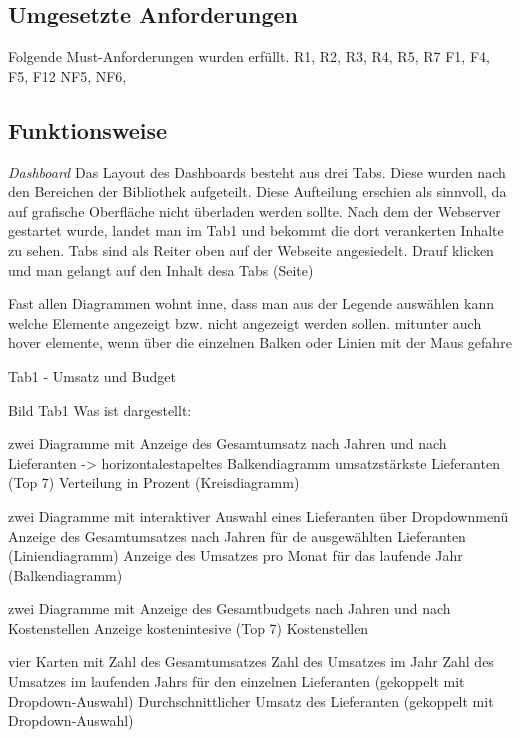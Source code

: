   

    \subsection{Umgesetzte Anforderungen}
    Folgende Must-Anforderungen wurden erfüllt.
    R1, R2, R3, R4, R5, R7
    F1, F4, F5, F12
    NF5, NF6, 
    \subsection{Funktionsweise}
    \textit{Dashboard}
    Das Layout des Dashboards besteht aus drei Tabs. Diese wurden nach den Bereichen der Bibliothek aufgeteilt. Diese Aufteilung erschien als sinnvoll,
    da auf grafische Oberfläche nicht überladen werden sollte.
    Nach dem der Webserver gestartet wurde, landet man im Tab1 und bekommt die dort verankerten Inhalte zu sehen.
    Tabs sind als Reiter oben auf der Webseite angesiedelt.
    Drauf klicken und man gelangt auf den Inhalt desa Tabs (Seite)
    
    Fast allen Diagrammen wohnt inne, dass man aus der Legende auswählen kann welche Elemente angezeigt bzw. nicht angezeigt werden sollen.
    mitunter auch hover elemente, wenn über die einzelnen Balken oder Linien mit der Maus gefahre 
    
    Tab1 - Umsatz und Budget
    
    Bild Tab1
    Was ist dargestellt:
    
    zwei Diagramme mit 
        Anzeige des Gesamtumsatz nach Jahren und nach Lieferanten ->  horizontalestapeltes Balkendiagramm
        umsatzstärkste Lieferanten (Top 7) Verteilung in Prozent (Kreisdiagramm)
        
    zwei Diagramme mit interaktiver Auswahl eines Lieferanten über Dropdownmenü
        Anzeige des Gesamtumsatzes nach Jahren für de ausgewählten Lieferanten (Liniendiagramm)
        Anzeige des Umsatzes pro Monat für das laufende Jahr (Balkendiagramm)
    
    zwei Diagramme mit
        Anzeige des Gesamtbudgets nach Jahren und nach Kostenstellen 
        Anzeige kostenintesive (Top 7) Kostenstellen
        
    
    vier Karten mit
        Zahl des Gesamtumsatzes
        Zahl des Umsatzes im Jahr
        Zahl des Umsatzes im laufenden Jahrs für den einzelnen Lieferanten (gekoppelt mit Dropdown-Auswahl)
        Durchschnittlicher Umsatz des Lieferanten (gekoppelt mit Dropdown-Auswahl)
    
    
    
